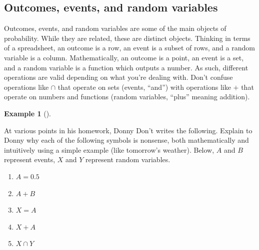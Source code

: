 \documentclass[
  letterpaper,
  DIV=11,
  numbers=noendperiod]{scrreprt}
\providecommand{\tightlist}{%
  \setlength{\itemsep}{0pt}\setlength{\parskip}{0pt}}
\theoremstyle{plain}
\theoremstyle{definition}
\newtheorem{example}{Example}[chapter]
\theoremstyle{definition}
\theoremstyle{definition}
\theoremstyle{remark}
\begin{document}
\subsection{Outcomes, events, and random
variables}\label{outcomes-events-and-random-variables}

Outcomes, events, and random variables are some of the main objects of
probability. While they are related, these are distinct objects.
Thinking in terms of a spreadsheet, an outcome is a row, an event is a
subset of rows, and a random variable is a column. Mathematically, an
outcome is a point, an event is a set, and a random variable is a
function which outputs a number. As such, different operations are valid
depending on what you're dealing with. Don't confuse operations like
\(\cap\) that operate on sets (events, ``and'') with operations like
\(+\) that operate on numbers and functions (random variables, ``plus''
meaning addition).

\begin{tcolorbox}[enhanced jigsaw, opacityback=0, left=2mm, colframe=quarto-callout-note-color-frame, toprule=.15mm, breakable, colback=white, leftrule=.75mm, arc=.35mm, rightrule=.15mm, bottomrule=.15mm]

\begin{example}[]\protect\hypertarget{exm-dd-events}{}\label{exm-dd-events}

At various points in his homework, Donny Don't writes the following.
Explain to Donny why each of the following symbols is nonsense, both
mathematically and intuitively using a simple example (like tomorrow's
weather). Below, \(A\) and \(B\) represent events, \(X\) and \(Y\)
represent random variables.

\begin{enumerate}
\def\labelenumi{\arabic{enumi}.}
\tightlist
\item
  \(A = 0.5\)
\item
  \(A + B\)
\item
  \(X = A\)
\item
  \(X + A\)
\item
  \(X \cap Y\)
\end{enumerate}

\end{example}

\end{tcolorbox}
\end{document}
